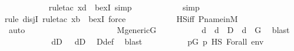 \begin{isabellebody}
\ \ \ \ \ \ \ \ \ \ \isamarkupfalse%
{\isacharparenleft}{\kern0pt}rule{\isacharunderscore}{\kern0pt}tac\ x{\isacharequal}{\kern0pt}d\ \ bexI{\isacharcomma}{\kern0pt}\ simp{\isacharparenright}{\kern0pt}\isanewline
\ \ \ \ \ \ \ \ \ \ \isamarkupfalse%
\ simp\isanewline
\ \ \ \ \ \ \ \ \ \ \isamarkupfalse%
{\isacharparenleft}{\kern0pt}rule\ disjI{}{\isacharcomma}{\kern0pt}\ rule{\isacharunderscore}{\kern0pt}tac\ x{\isacharequal}{\kern0pt}b\ \ bexI{\isacharcomma}{\kern0pt}\ force{\isacharparenright}{\kern0pt}\isanewline
\ \ \ \ \ \ \ \ \ \ \isamarkupfalse%
\ HS{\isacharunderscore}{\kern0pt}iff\ P{\isacharunderscore}{\kern0pt}name{\isacharunderscore}{\kern0pt}in{\isacharunderscore}{\kern0pt}M\isanewline
\ \ \ \ \ \ \ \ \ \ \isamarkupfalse%
\ auto\isanewline
\ \ \ \ \ \ \isamarkupfalse%
\isanewline
\ \ \ \ \isamarkupfalse%
\isanewline
\ \ \ \ \isamarkupfalse%
\isanewline
\ \ \ \ \isamarkupfalse%
\ {\isacartoucheopen}M{\isacharunderscore}{\kern0pt}generic{\isacharparenleft}{\kern0pt}G{\isacharparenright}{\kern0pt}{\isacartoucheclose}\isanewline
\ \ \ \ \isamarkupfalse%
\isanewline
\ \ \ \ \isamarkupfalse%
\ d\ \ {\isachardoublequoteopen}d\ {\isasymin}\ D{\isachardoublequoteclose}\ \ {\isachardoublequoteopen}d\ {\isasymin}\ G{\isachardoublequoteclose}\ \isamarkupfalse%
\ blast\isanewline
\ \ \ \ \isamarkupfalse%
\isanewline
\ \ \ \ \isamarkupfalse%
\ {\isacharparenleft}{\kern0pt}{}{\isacharparenright}{\kern0pt}\ {\isachardoublequoteopen}d{\isasymin}{\isacharquery}{\kern0pt}D{}{\isachardoublequoteclose}\ {\isacharbar}{\kern0pt}\ {\isacharparenleft}{\kern0pt}{}{\isacharparenright}{\kern0pt}\ {\isachardoublequoteopen}d{\isasymin}{\isacharquery}{\kern0pt}D{}{\isachardoublequoteclose}\ \isamarkupfalse%
\ D{\isacharunderscore}{\kern0pt}def\ \isamarkupfalse%
\ blast\isanewline
\ \ \ \ \isamarkupfalse%
\isanewline
\ \ \ \ \isamarkupfalse%
\ {\isachardoublequoteopen}{\isasymexists}p{\isasymin}G{\isachardot}{\kern0pt}\ {\isacharparenleft}{\kern0pt}p\ {\isasymtturnstile}HS\ Forall{\isacharparenleft}{\kern0pt}{\isasymphi}{\isacharparenright}{\kern0pt}\ env{\isacharparenright}{\kern0pt}{\isachardoublequoteclose}\isanewline
\ \ \ \ \isamarkupfalse%

\end{isabellebody}
